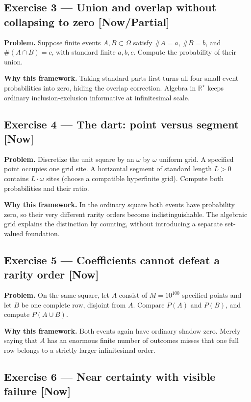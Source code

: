 \documentclass[11pt]{article}
\newcommand{\Rstar}{\mathbb{R}^{\star}}
\begin{document}
\subsection*{Exercise 3 --- Union and overlap without collapsing to zero \hfill \normalfont\small[Now/Partial]}

\textbf{Problem.} Suppose finite events $A,B\subset \Omega$ satisfy $\#A = a$,
$\#B = b$, and $\#(A\cap B) = c$, with standard finite $a,b,c$. Compute
the probability of their union.

\textbf{Why this framework.} Taking standard parts first turns all four small-event
probabilities into zero, hiding the overlap correction. Algebra in $\Rstar$ keeps
ordinary inclusion-exclusion informative at infinitesimal scale.


\subsection*{Exercise 4 --- The dart: point versus segment \hfill \normalfont\small[Now]}

\textbf{Problem.} Discretize the unit square by an $\omega$ by $\omega$ uniform grid.
A specified point occupies one grid site. A horizontal segment of standard
length $L > 0$ contains $L\cdot \omega$ sites (choose a compatible hyperfinite grid).
Compute both probabilities and their ratio.

\textbf{Why this framework.} In the ordinary square both events have probability
zero, so their very different rarity orders become indistinguishable. The
algebraic grid explains the distinction by counting, without introducing a
separate set-valued foundation.


\subsection*{Exercise 5 --- Coefficients cannot defeat a rarity order \hfill \normalfont\small[Now]}

\textbf{Problem.} On the same square, let $A$ consist of $M = 10^{100}$ specified
points and let $B$ be one complete row, disjoint from $A$. Compare $P(A)$ and
$P(B)$, and compute $P(A\cup B)$.

\textbf{Why this framework.} Both events again have ordinary shadow zero. Merely
saying that $A$ has an enormous finite number of outcomes misses that one full
row belongs to a strictly larger infinitesimal order.


\subsection*{Exercise 6 --- Near certainty with visible failure \hfill \normalfont\small[Now]}
\end{document}
